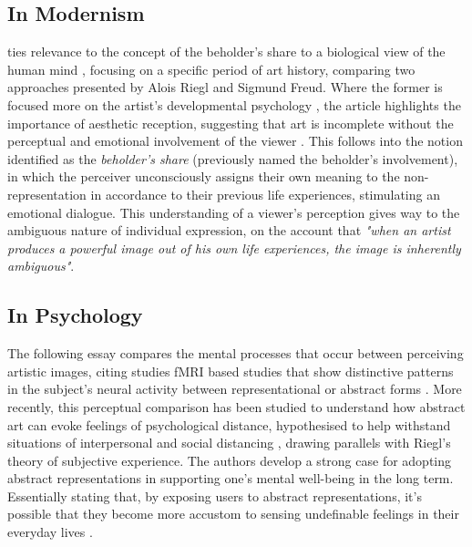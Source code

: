 \subsection{In Modernism}

\citeauthor{kandel_two_2013} ties relevance to the concept of the beholder's share to a biological view of the human mind \cite{kandel_two_2013}, focusing on a specific period of art history, comparing two approaches presented by Alois Riegl and Sigmund Freud. Where the former is focused more on the artist's developmental psychology \cite{freud_leonardo_1999}, the article highlights the importance of aesthetic reception, suggesting that art is incomplete without the perceptual and emotional involvement of the viewer \cite{riegl_group_1999}. This follows into the notion identified as the \textit{beholder's share} (previously named the beholder's involvement), in which the perceiver unconsciously assigns their own meaning to the non-representation in accordance to their previous life experiences, stimulating an emotional dialogue. This understanding of a viewer's perception gives way to the ambiguous nature of individual expression, on the account that \textit{"when an artist produces a powerful image out of his own life experiences, the image is inherently ambiguous"}.

\subsection{In Psychology}

The following essay compares the mental processes that occur between perceiving artistic images, citing studies fMRI based studies that show distinctive patterns in the subject's neural activity between representational or abstract forms \cite{aviv_what_2014}. More recently, this perceptual comparison has been studied to understand how abstract art can evoke feelings of psychological distance, hypothesised to help withstand situations of interpersonal and social distancing \cite{durkin_objective_2020}, drawing parallels with Riegl's theory of subjective experience. The authors develop a strong case for adopting abstract representations in supporting one's mental well-being in the long term. Essentially stating that, by exposing users to abstract representations, it's possible that they become more accustom to sensing undefinable feelings in their everyday lives \cite{durkin_objective_2020}.


